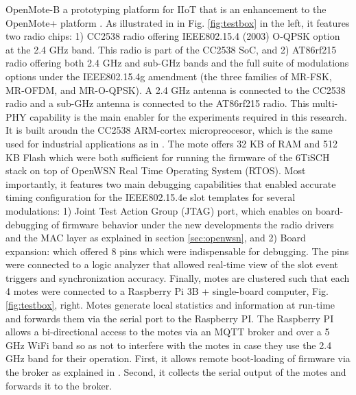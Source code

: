 \documentclass[journal]{IEEEtran}
\begin{document}

OpenMote-B a prototyping platform for IIoT that is an enhancement to the OpenMote+ platform \cite{tusetopenmote}. 
As illustrated in in Fig. \ref{fig:testbox} in the left,  it features two radio chips: 
	1) CC2538 radio offering IEEE802.15.4 (2003) O-QPSK option at the 2.4 GHz band. This radio is part of the CC2538 SoC, and 
    2) AT86rf215 radio offering both 2.4 GHz and sub-GHz bands and the full suite of modulations options under the IEEE802.15.4g amendment (the three families of MR-FSK, MR-OFDM, and MR-O-QPSK). 
A 2.4 GHz antenna is connected to the CC2538 radio and a sub-GHz antenna is connected to the AT86rf215 radio.
This multi-PHY capability is the main enabler for the experiments required in this research. 
It is built aroudn the CC2538 ARM-cortex micropreocesor, which is the same used for industrial applications as in \cite{civerchia17industrial}.
The mote offers 32 KB of RAM and 512 KB Flash which were both sufficient for running the firmware of the 6TiSCH stack on top of OpenWSN Real Time Operating System (RTOS). 
Most importantly, it features two main debugging capabilities that enabled accurate timing configuration for the IEEE802.15.4e slot templates for several modulations:
1) Joint Test Action Group (JTAG) port, which enables on board-debugging of firmware behavior under the new developments the radio drivers and the MAC layer as explained in section \ref{sec:openwsn}, and 
2) Board expansion: which offered 8 pins which were indispensable for debugging. The pins were connected to a logic analyzer that allowed real-time view of the slot event triggers and synchronization accuracy.
Finally, motes are clustered such that each 4 motes were connected to a Raspberry Pi 3B + single-board computer, Fig. \ref{fig:testbox}, right.
Motes generate local statistics and information at run-time and forwards them via the serial port to the Raspberry PI. 
The Raspberry PI allows a bi-directional access to the motes via an MQTT broker and over a 5 GHz WiFi band so as not to interfere with the motes in case they use the 2.4 GHz band for their operation.
First, it allows remote boot-loading of firmware via the broker as explained in \cite{munoz19opentestbed}.
Second, it collects the serial output of the motes and forwards it to the  broker. 
\end{document}
